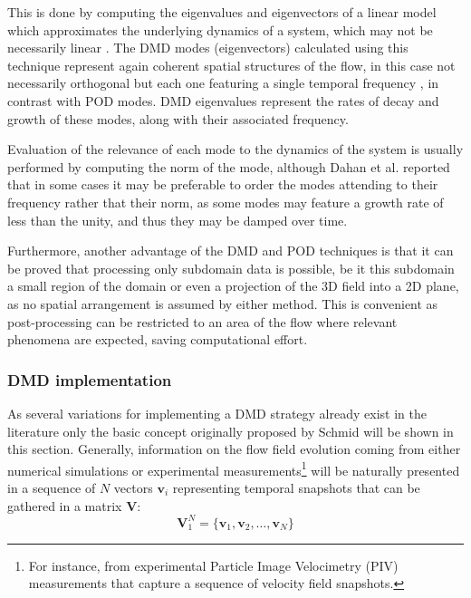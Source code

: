 This is done by computing the eigenvalues and eigenvectors of a linear model which approximates the underlying dynamics of a system, which may not be necessarily linear \cite{chen2012variants}. The DMD modes (eigenvectors) calculated using this technique represent again coherent spatial structures of the flow, in this case not necessarily orthogonal but each one featuring a single temporal frequency \cite{jovanovic2014sparsity}, in contrast with POD modes. DMD eigenvalues represent the rates of decay and growth of these modes, along with their associated frequency.

Evaluation of the relevance of each mode to the dynamics of the system is usually performed by computing the norm of the mode, although Dahan et al. reported \cite{dahan2014aero} that in some cases it may be preferable to order the modes attending to their frequency rather that their norm, as some modes may feature a growth rate of less than the unity, and thus they may be damped over time.

Furthermore, another advantage of the DMD and POD techniques is that it can be proved \cite{schmid2010dynamic,schmid2011applications} that processing only subdomain data is possible, be it this subdomain a small region of the domain or even a projection of the 3D field into a 2D plane, as no spatial arrangement is assumed by either method. This is convenient as post-processing can be restricted to an area of the flow where relevant phenomena are expected, saving computational effort.

\subsubsection{DMD implementation}

As several variations for implementing a DMD strategy already exist in the literature only the basic concept originally proposed by Schmid \cite{schmid2010dynamic} will be shown in this section. Generally, information on the flow field evolution coming from either numerical simulations or experimental measurements\footnote{For instance, from experimental Particle Image Velocimetry (PIV) measurements that capture a sequence of velocity field snapshots.} will be naturally presented in a sequence of $N$ vectors $\mathbf v_i$ representing temporal snapshots that can be gathered in a matrix $\mathbf V$:
\begin{equation}\label{eq:dmd_snaps}
	\mathbf V_1^N = \{\mathbf v_1, \mathbf v_2, \dots, \mathbf v_N\}
\end{equation}

